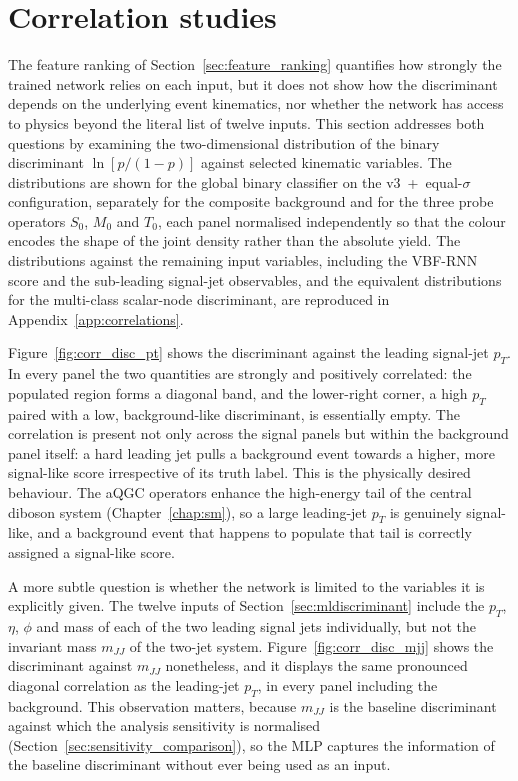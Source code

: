 \section{Correlation studies}
\label{sec:correlation_studies}

The feature ranking of Section~\ref{sec:feature_ranking} quantifies how strongly the trained network relies on each input, but it does not show how the discriminant depends on the underlying event kinematics, nor whether the network has access to physics beyond the literal list of twelve inputs. This section addresses both questions by examining the two-dimensional distribution of the binary discriminant $\ln[p/(1-p)]$ against selected kinematic variables. The distributions are shown for the global binary classifier on the v3~+~equal-$\sigma$ configuration, separately for the composite background and for the three probe operators $S_0$, $M_0$ and $T_0$, each panel normalised independently so that the colour encodes the shape of the joint density rather than the absolute yield. The distributions against the remaining input variables, including the VBF-RNN score and the sub-leading signal-jet observables, and the equivalent distributions for the multi-class scalar-node discriminant, are reproduced in Appendix~\ref{app:correlations}.

Figure~\ref{fig:corr_disc_pt} shows the discriminant against the leading signal-jet $p_T$. In every panel the two quantities are strongly and positively correlated: the populated region forms a diagonal band, and the lower-right corner, a high $p_T$ paired with a low, background-like discriminant, is essentially empty. The correlation is present not only across the signal panels but within the background panel itself: a hard leading jet pulls a background event towards a higher, more signal-like score irrespective of its truth label. This is the physically desired behaviour. The aQGC operators enhance the high-energy tail of the central diboson system (Chapter~\ref{chap:sm}), so a large leading-jet $p_T$ is genuinely signal-like, and a background event that happens to populate that tail is correctly assigned a signal-like score.

A more subtle question is whether the network is limited to the variables it is explicitly given. The twelve inputs of Section~\ref{sec:mldiscriminant} include the $p_T$, $\eta$, $\phi$ and mass of each of the two leading signal jets individually, but not the invariant mass $m_{JJ}$ of the two-jet system. Figure~\ref{fig:corr_disc_mjj} shows the discriminant against $m_{JJ}$ nonetheless, and it displays the same pronounced diagonal correlation as the leading-jet $p_T$, in every panel including the background. This observation matters, because $m_{JJ}$ is the baseline discriminant against which the analysis sensitivity is normalised (Section~\ref{sec:sensitivity_comparison}), so the MLP captures the information of the baseline discriminant without ever being used as an input.

